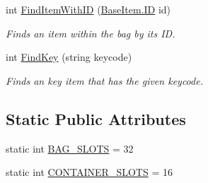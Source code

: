 \begin{DoxyCompactItemize}
int \mbox{\hyperlink{class_bag_a089ef28af0c9fe39cc430b1826a313a7}{Find\+Item\+With\+ID}} (\mbox{\hyperlink{class_base_item_add9920d2f5a4fa91752714a8f3ab424b}{Base\+Item.\+ID}} id)
\begin{DoxyCompactList}\small\item\em Finds an item within the bag by its ID. \end{DoxyCompactList}\item 
int \mbox{\hyperlink{class_bag_ab913ca67bac7d4a740a470dbb1632311}{Find\+Key}} (string keycode)
\begin{DoxyCompactList}\small\item\em Finds an key item that has the given keycode. \end{DoxyCompactList}\end{DoxyCompactItemize}
\subsection*{Static Public Attributes}
\begin{DoxyCompactItemize}
\item 
static int \mbox{\hyperlink{class_bag_aa3277af2938bf5bc9447535318668ced}{B\+A\+G\+\_\+\+S\+L\+O\+TS}} = 32
\item 
static int \mbox{\hyperlink{class_bag_ac513120e71acce6fffca5d0e78733182}{C\+O\+N\+T\+A\+I\+N\+E\+R\+\_\+\+S\+L\+O\+TS}} = 16
\end{DoxyCompactItemize}
